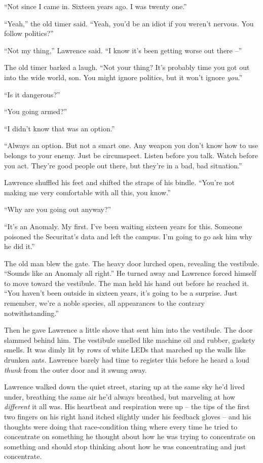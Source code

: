 “Not since I came in. Sixteen years ago. I was twenty one.”

“Yeah,” the old timer said. “Yeah, you'd be an idiot if you 
weren't nervous. You follow politics?”

“Not my thing,” Lawrence said. “I know it's been getting worse 
out there --”

The old timer barked a laugh. “Not your thing? It's probably time you 
got out into the wide world, son. You might ignore politics, but it 
won't ignore \emph{you}.”

“Is it dangerous?”

“You going armed?”

“I didn't know that was an option.”

“Always an option. But not a smart one. Any weapon you don't know how 
to use belongs to your enemy. Just be circumspect. Listen before you 
talk. Watch before you act. They're good people out there, but they're 
in a bad, bad situation.”

Lawrence shuffled his feet and shifted the straps of his bindle. 
“You're not making me very comfortable with all this, you know.”

“Why are you going out anyway?”

“It's an Anomaly. My first. I've been waiting sixteen years for this. 
Someone poisoned the Securitat's data and left the campus. I'm going to 
go ask him why he did it.”

The old man blew the gate. The heavy door lurched open, revealing the 
vestibule. “Sounds like an Anomaly all right.” He turned away and 
Lawrence forced himself to move toward the vestibule. The man held his 
hand out before he reached it. “You haven't been outside in sixteen 
years, it's going to be a surprise. Just remember, we're a noble 
species, all appearances to the contrary notwithstanding.”

Then he gave Lawrence a little shove that sent him into the vestibule. 
The door slammed behind him. The vestibule smelled like machine oil and 
rubber, gaskety smells. It was dimly lit by rows of white LEDs that 
marched up the walls like drunken ants. Lawrence barely had time to 
register this before he heard a loud \emph{thunk} from the outer door 
and it swung away.

\tb

Lawrence walked down the quiet street, staring up at the same sky he'd 
lived under, breathing the same air he'd always breathed, but marveling 
at how \emph{different} it all was. His heartbeat and respiration were 
up -- the tips of the first two fingers on his right hand itched 
slightly under his feedback gloves -- and his thoughts were doing that 
race-condition thing where every time he tried to concentrate on 
something he thought about how he was trying to concentrate on 
something and should stop thinking about how he was concentrating and 
just concentrate.

